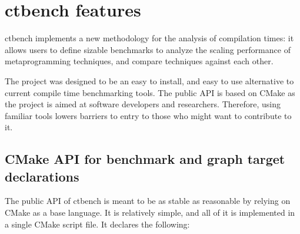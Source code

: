 \documentclass[../main]{subfiles}
\begin{document}
\section{
  ctbench features
}

ctbench implements a new methodology for the analysis of compilation times:
it allows users to define \cpp sizable benchmarks to analyze the scaling
performance of \cpp metaprogramming techniques, and compare techniques
against each other.

The project was designed to be an easy to install,
and easy to use alternative to current compile time benchmarking tools.
The public API is based on CMake as the project is aimed at \cpp software
developers and researchers. Therefore, using familiar tools
lowers barriers to entry to those who might want to contribute to it.

\subsection{
  CMake API for benchmark and graph target declarations
}
\label{lbl:ctbench-cmake-api}

The public API of ctbench is meant to be as stable as reasonable by relying on
CMake as a base language. It is relatively simple, and all of it is implemented
in a single CMake script file. It declares the following:
\end{document}
